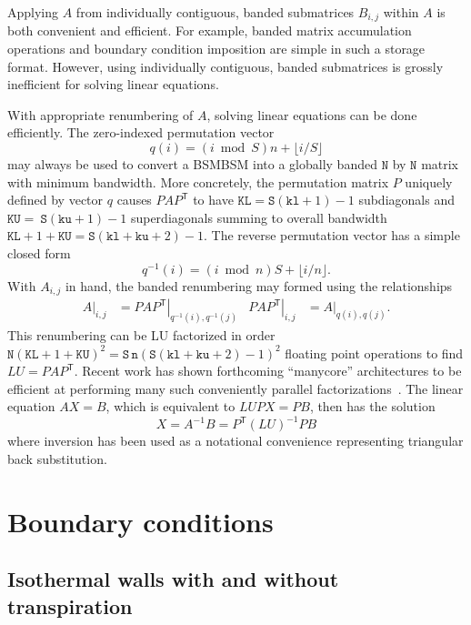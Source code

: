 \documentclass[letterpaper,11pt,nointlimits,reqno,draft]{amsbook}
\newcommand{\trans}[1]{{#1}^{\ensuremath{\mathsf{T}}}}
\begin{document}
Applying $A$ from individually contiguous, banded submatrices $B_{i,j}$ within
$A$ is both convenient and efficient.  For example, banded matrix accumulation
operations and boundary condition imposition are simple in such a storage
format.  However, using individually contiguous, banded submatrices is grossly
inefficient for solving linear equations.

With appropriate renumbering of $A$, solving linear equations can be done
efficiently.  The zero-indexed permutation vector \[q(i) =
\left(i\bmod{}S\right)n + \lfloor{}i/S\rfloor{}\] may always be used to convert
a BSMBSM into a globally banded $\mathtt{N}$ by $\mathtt{N}$ matrix with
minimum bandwidth.  More concretely, the permutation matrix $P$ uniquely
defined by vector $q$ causes $P A \trans{P}$ to have $\mathtt{KL} =
\mathtt{S}\left(\mathtt{kl}+1\right)-1$ subdiagonals and
$\mathtt{KU}=~\mathtt{S}\left(\mathtt{ku}+1\right)-1$ superdiagonals summing to
overall bandwidth $\mathtt{KL} + 1 + \mathtt{KU} = \mathtt{S}\left(\mathtt{kl}
+ \mathtt{ku} + 2\right)-1$.  The reverse permutation vector has a simple
closed form \[q^{-1}(i) = \left(i\bmod{}n\right)S + \lfloor{}i/n\rfloor{}.\]
With $A_{i,j}$ in hand, the banded renumbering may formed using the
relationships
\begin{align*}
       \left.A\right|_{i,j}
    &= \left.P A \trans{P}\right|_{q^{-1}(i),q^{-1}(j)}
    &
       \left.P A \trans{P}\right|_{i,j}
    &= \left.A\right|_{q(i),q(j)}.
\end{align*}
This renumbering can be LU factorized in order $\mathtt{N}\left(\mathtt{KL} + 1
+ \mathtt{KU}\right)^2 =
\mathtt{S}\,\mathtt{n}\left(\mathtt{S}\left(\mathtt{kl} + \mathtt{ku} +
2\right)-1\right)^2$ floating point operations to find $LU = P A \trans{P}$.
Recent work has shown forthcoming ``manycore'' architectures to be efficient at
performing many such conveniently parallel
factorizations~\citep{Schulz2012Early}.  The linear equation $AX=B$, which is
equivalent to $LUPX=PB$, then has the solution \[X = A^{-1}B =
\trans{P}\left(LU\right)^{-1}PB\] where inversion has been used as a notational
convenience representing triangular back substitution.

\section{Boundary conditions}

\subsection{Isothermal walls with and without transpiration}
\end{document}

